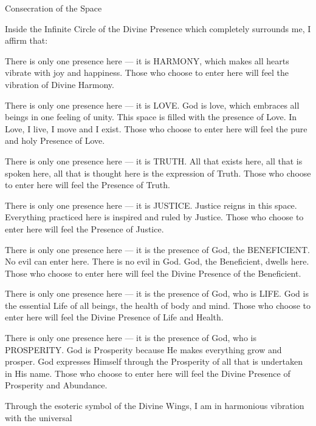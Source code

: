   \begin{passage}[EN]{Consecration of the Space}
    \par
    Inside the Infinite Circle of the Divine Presence
    which completely surrounds me, I affirm that:
    \par
    There is only one presence here --- it is HARMONY,
    which makes all hearts vibrate with joy and happiness.
    Those who choose to enter here will feel the vibration
    of Divine Harmony.
    \par
    There is only one presence here --- it is LOVE.
    God is love, which embraces all beings in one
    feeling of unity. This space is filled with the
    presence of Love. In Love, I live, I move and I
    exist. Those who choose to enter here will feel
    the pure and holy Presence of Love.
    \par
    There is only one presence here --- it is TRUTH.
    All that exists here, all that is spoken here,
    all that is thought here is the expression of
    Truth. Those who choose to enter here will feel
    the Presence of Truth.
    \par
    There is only one presence here --- it is JUSTICE.
    Justice reigns in this space. Everything practiced
    here is inspired and ruled by Justice. Those who
    choose to enter here will feel the Presence of
    Justice.
    \par
    There is only one presence here --- it is the
    presence of God, the BENEFICIENT. No evil can enter
    here. There is no evil in God. God, the Beneficient,
    dwells here. Those who choose to enter here will
    feel the Divine Presence of the Beneficient.
    \par
    There is only one presence here --- it is the
    presence of God, who is LIFE. God is the essential
    Life of all beings, the health of body and mind.
    Those who choose to enter here will feel the Divine
    Presence of Life and Health.
    \par
    There is only one presence here --- it is the
    presence of God, who is PROSPERITY. God is
    Prosperity because He makes everything grow and
    prosper. God expresses Himself through the
    Prosperity of all that is undertaken in His name.
    Those who choose to enter here will feel the
    Divine Presence of Prosperity and Abundance.
    \par
    Through the esoteric symbol of the Divine Wings,
    I am in harmonious vibration with the universal

\end{passage}
